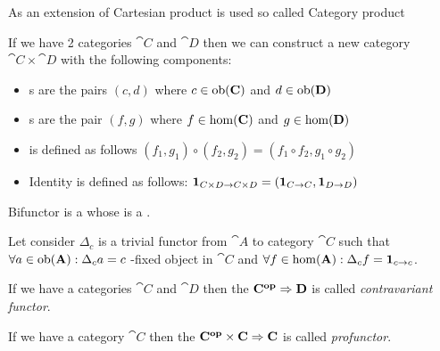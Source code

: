 As an extension of Cartesian product is used so called Category product
\begin{definition}
\label{def:category_product}
If we have 2 categories $\cat{C}$ and $\cat{D}$ then we can construct
a new category $\cat{C} \times \cat{D}$ with the following components:
\begin{itemize}
\item {}s are the pairs $(c,d)$ where $c \in
  \mathrm{ob}(\mathbf{C})$ and $d \in \mathrm{ob}(\mathbf{D})$
\item {}s are the pair $(f,g)$ where $f \in
  \mathrm{hom}(\mathbf{C})$ and $g \in \mathrm{hom}(\mathbf{D})$
\item {} is defined as follows 
\(
(f_1, g_1) \circ (f_2, g_2) = (f_1 \circ f_2, g_1 \circ g_2)
\)
\item Identity is defined as follows: $\mathbf{1}_{ C \times D \to C \times D } = 
\left(\mathbf{1}_{ C \to C }, \mathbf{1}_{ D \to D }\right)$
\end{itemize}
\end{definition}

\begin{definition}[Bifunctor]
\label{def:bifunctor}
Bifunctor is a  whose  is
a . 
\end{definition}

\begin{definition}
\label{def:terminal_object_cat}
Let consider $\Delta_c$ is a trivial functor from 
$\cat{A}$ to category $\cat{C}$ such that $\forall a \in \mathrm{ob}(\mathbf{A}):
\Delta_c a = c$ -fixed object in $\cat{C}$ and 
$\forall f \in \mathrm{hom}(\mathbf{A}): \Delta_c f = \mathbf{1}_{ c \to c }$.
\end{definition}

\begin{definition}
\label{def:contravariant_functor}
If we have a categories $\cat{C}$ and $\cat{D}$ then the
 $\mathbf{C^{op}} \Rightarrow \mathbf{D}$ is called
\textit{contravariant functor}. 
\end{definition}

\begin{definition}[Profunctor]
\label{def:profunctor}
If we have a category $\cat{C}$ then the 
$\mathbf{C^{op}} \times \mathbf{C} \Rightarrow \mathbf{C}$ is called
\textit{profunctor}. 
\end{definition}

